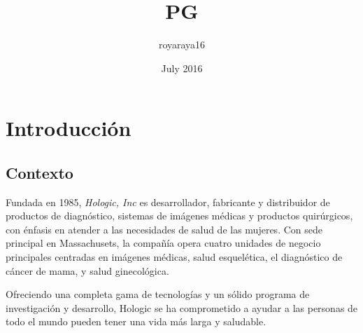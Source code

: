 \documentclass[12pt, twoside, letterpaper]{book}
\title{PG}
\author{royaraya16 }
\date{July 2016}
\begin{document}
%	






\newpage


\chapter{Introducci\'on}

\section{Contexto}

Fundada en 1985, \emph{Hologic, Inc} es desarrollador, fabricante
y distribuidor de productos de diagn\'ostico, sistemas de im\'agenes
m\'edicas y productos quir\'urgicos, con \'enfasis en atender a las necesidades de salud de las mujeres.
Con sede principal en Massachusets, la compa\~n\'ia opera cuatro unidades de negocio principales centradas en im\'agenes m\'edicas,
salud esquel\'etica, el diagn\'ostico de c\'ancer de mama, y salud ginecol\'ogica. 

Ofreciendo una completa gama de tecnolog\'ias y un s\'olido programa de investigaci\'on y desarrollo, Hologic
se ha comprometido a ayudar a las personas de todo el mundo pueden tener una vida m\'as
larga y saludable. \par
\end{document}
